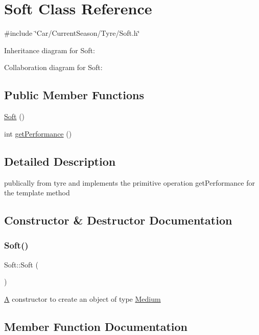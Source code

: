 \hypertarget{classSoft}{}\section{Soft Class Reference}
\label{classSoft}


{\ttfamily \#include \char`\"{}Car/\+Current\+Season/\+Tyre/\+Soft.\+h\char`\"{}}



Inheritance diagram for Soft\+:


Collaboration diagram for Soft\+:
\subsection*{Public Member Functions}
\begin{DoxyCompactItemize}
\item 
\hyperlink{classSoft_afd05f47d2416be24209308d448ec2979}{Soft} ()
\item 
int \hyperlink{classSoft_af95cbbd4a3dc573edc5a6eaae725932f}{get\+Performance} ()
\end{DoxyCompactItemize}


\subsection{Detailed Description}
publically from tyre and implements the primitive operation get\+Performance for the template method 

\subsection{Constructor \& Destructor Documentation}
\mbox{\label{classSoft_afd05f47d2416be24209308d448ec2979}} 
\subsubsection{\texorpdfstring{Soft()}{Soft()}}
{\footnotesize\ttfamily Soft\+::\+Soft (\begin{DoxyParamCaption}{ }\end{DoxyParamCaption})}

\hyperlink{classA}{A} constructor to create an object of type \hyperlink{classMedium}{Medium} 

\subsection{Member Function Documentation}
\mbox{\label{classSoft_af95cbbd4a3dc573edc5a6eaae725932f}} 
